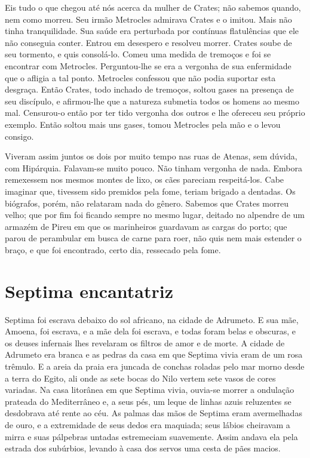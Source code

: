 Eis tudo o que chegou até nós acerca da mulher de Crates; não sabemos
quando, nem como morreu. Seu irmão Metrocles admirava Crates e o imitou.
Mais não tinha tranquilidade. Sua saúde era perturbada por contínuas
flatulências que ele não conseguia conter. Entrou em desespero e resolveu
morrer. Crates soube de seu tormento, e quis consolá-lo. Comeu uma medida
de tremoços e foi se encontrar com Metrocles. Perguntou-lhe se era a
vergonha de sua enfermidade que o afligia a tal ponto. Metrocles confessou
que não podia suportar esta desgraça. Então Crates, todo inchado de
tremoços, soltou gases na presença de seu discípulo, e afirmou-lhe que a
natureza submetia todos os homens ao mesmo mal. Censurou-o então por ter
tido vergonha dos outros e lhe ofereceu seu próprio exemplo. Então soltou
mais uns gases, tomou Metrocles pela mão e o levou consigo.

Viveram assim juntos os dois por muito tempo nas ruas de Atenas, sem dúvida,
com Hipárquia. Falavam-se muito pouco. Não tinham vergonha de nada. Embora
remexessem nos mesmos montes de lixo, os cães pareciam respeitá-los. Cabe
imaginar que, tivessem sido premidos pela fome, teriam brigado a dentadas.
Os biógrafos, porém, não relataram nada do gênero. Sabemos que Crates
morreu velho; que por fim foi ficando sempre no mesmo lugar, deitado no
alpendre de um armazém de Pireu em que os marinheiros guardavam as cargas
do porto; que parou de perambular em busca de carne para roer, não quis
nem mais estender o braço, e que foi encontrado, certo dia, ressecado pela
fome.

\chapter{Septima encantatriz}

Septima foi escrava debaixo do sol africano, na cidade de Adrumeto. E sua
mãe, Amoena, foi escrava, e a mãe dela foi escrava, e todas foram belas e
obscuras, e os deuses infernais lhes revelaram os filtros de amor e de
morte. A cidade de Adrumeto era branca e as pedras da casa em que Septima
vivia eram de um rosa trêmulo. E a areia da praia era juncada de conchas
roladas pelo mar morno desde a terra do Egito, ali onde as sete bocas do
Nilo vertem sete vasos de cores variadas. Na casa litorânea em que Septima
vivia, ouvia-se morrer a ondulação prateada do Mediterrâneo e, a seus pés,
um leque de linhas azuis reluzentes se desdobrava até rente ao céu. As
palmas das mãos de Septima eram avermelhadas de ouro, e a extremidade de
seus dedos era maquiada; seus lábios cheiravam a mirra e suas pálpebras
untadas estremeciam suavemente. Assim andava ela pela estrada dos
subúrbios, levando à casa dos servos uma cesta de pães macios.

